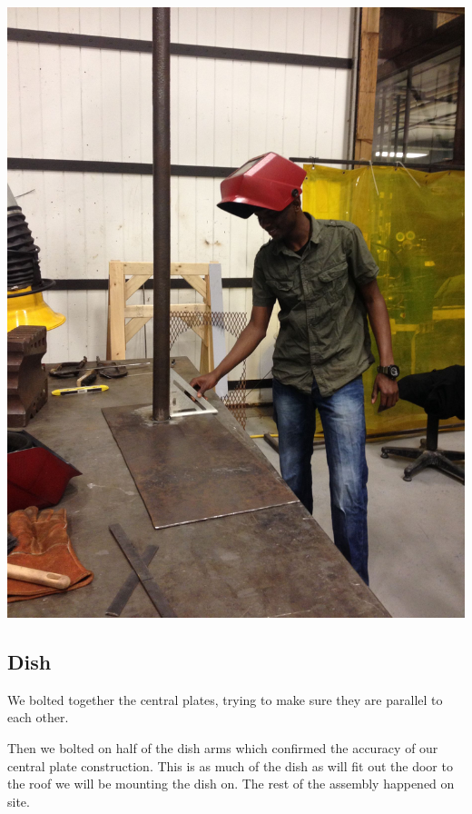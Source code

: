 \documentclass[11pt]{article} %
\begin{document}
\begin{center}
\includegraphics[scale=0.12]{roofmount/05.jpeg}
\end{center}


\subsection{Dish}

We bolted together the central plates, trying to make sure they are parallel to each other.

Then we bolted on half of the dish arms which confirmed the accuracy of our central plate construction. This is as much of the dish as will fit out the door to the roof we will be mounting the dish on. The rest of the assembly happened on site.
\end{document}
